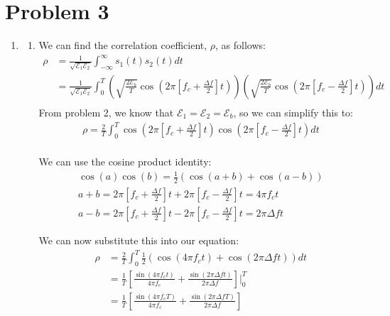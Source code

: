 \documentclass{article}
\begin{document}
\section{Problem 3}
\begin{enumerate}[label=3.\arabic*]
    \item \begin{enumerate}[label=\alph*.]
        \item We can find the correlation coefficient, $\rho$, as follows:
        \begin{align*}
            \rho &= \frac{1}{\sqrt{\mathcal{E}_1 \mathcal{E}_2}} \int_{-\infty}^{\infty} s_1(t) s_2(t) dt \\
            &= \frac{1}{\sqrt{\mathcal{E}_1 \mathcal{E}_2}} \int_{0}^{T} \left(\sqrt{\frac{2\mathcal{E}_b}{T}}\cos(2\pi \left[f_c + \frac{\Delta f}{2}\right]t)\right)\left(\sqrt{\frac{2\mathcal{E}_b}{T}}\cos(2\pi \left[f_c - \frac{\Delta f}{2}\right] t)\right) dt \\
        \end{align*}
        From problem 2, we know that $\mathcal{E}_1 = \mathcal{E}_2 = \mathcal{E}_b$, so we can simplify this to:
        \begin{align*}
            \rho = \frac{2}{T} \int_{0}^{T} \cos\left(2\pi \left[f_c + \frac{\Delta f}{2}\right]t\right)\cos\left(2\pi \left[f_c - \frac{\Delta f}{2}\right] t\right) dt \\
        \end{align*}
        
        We can use the cosine product identity:
        \begin{align*}
            \cos(a)\cos(b) = \frac{1}{2}\left(\cos(a+b) + \cos(a-b)\right) \\
            a+b = 2\pi \left[ f_c + \frac{\Delta f}{2} \right]t + 2\pi \left[ f_c - \frac{\Delta f}{2} \right]t = 4\pi f_c t\\
            a-b = 2\pi \left[ f_c + \frac{\Delta f}{2} \right]t - 2\pi \left[ f_c - \frac{\Delta f}{2} \right] t = 2\pi \Delta f t
        \end{align*}
        
        We can now substitute this into our equation:
        \begin{align*}
            \rho &= \frac{2}{T}\int_{0}^{T} \frac{1}{2}\left(\cos(4\pi f_c t) + \cos(2\pi \Delta f t)\right) dt \\
            &= \frac{1}{T} \left[\frac{\sin(4\pi f_c t)}{4\pi f_c} + \frac{\sin(2\pi \Delta f t)}{2\pi \Delta f}\right] \Bigg|_{0}^{T} \\
            &= \frac{1}{T} \left[\frac{\sin(4\pi f_c T)}{4\pi f_c} + \frac{\sin(2\pi \Delta f T)}{2\pi \Delta f}\right]
        \end{align*}
        

\end{enumerate}
\end{enumerate}
\end{document}
